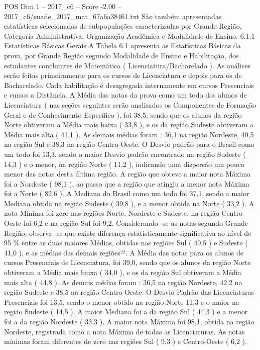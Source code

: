 \begin{textsample}{POS Dim 1 – 2017\_c6 – Score -2.00 – 2017\_c6/enade\_2017\_mat\_67a6a38461.txt}
São também apresentadas estatísticas selecionadas de subpopulações caracterizadas por Grande Região, Categoria Administrativa, Organização Acadêmica e Modalidade de Ensino. 6.1.1 Estatísticas Básicas Gerais A Tabela 6.1 apresenta as Estatísticas Básicas da prova, por Grande Região segundo Modalidade de Ensino e Habilitação, dos estudantes concluintes de Matemática ( Licenciatura/Bacharelado ).
As análises serão feitas primeiramente para os cursos de Licenciatura e depois para os de Bacharelado.
Cada habilitação é desagregada internamente em cursos Presenciais e cursos a Distância.
A Média das notas da prova como um todo dos alunos de Licenciatura ( nas seções seguintes serão analisados os Componentes de Formação Geral e de Conhecimento Específico ), foi 38,5, sendo que os alunos da região Norte obtiveram a Média mais baixa ( 33,8 ), e os da região Sudeste obtiveram a Média mais alta ( 41,1 ).
As demais médias foram : 36,1 na região Nordeste, 40,5 na região Sul e 38,3 na região Centro-Oeste.
O Desvio padrão para o Brasil como um todo foi 13,3, sendo o maior Desvio padrão encontrado na região Sudeste ( 14,3 ) e o menor, na região Norte ( 11,2 ), indicando uma dispersão um pouco menor das notas desta última região.
A região que obteve a maior nota Máxima foi a Nordeste ( 98,1 ), ao passo que a região que atingiu a menor nota Máxima foi a Norte ( 82,6 ).
A Mediana do Brasil como um todo foi 37,1, sendo a maior Mediana obtida na região Sudeste ( 39,8 ), e a menor obtida na Norte ( 33,2 ).
A nota Mínima foi zero nas regiões Norte, Nordeste e Sudeste, na região Centro-Oeste foi 6,2 e na região Sul foi 9,2.
Considerando -se as notas segundo Grande Região, observa -se que existe diferença estatisticamente significativa ao nível de 95 \% entre as duas maiores Médias, obtidas nas regiões Sul ( 40,5 ) e Sudeste ( 41,0 ), e as médias das demais regiões²².
A Média das notas para os alunos de cursos Presenciais de Licenciatura, foi 39,0, sendo que os alunos da região Norte obtiveram a Média mais baixa ( 34,0 ), e os da região Sul obtiveram a Média mais alta ( 44,8 ).
As demais médias foram : 36,5 na região Nordeste, 42,2 na região Sudeste e 38,5 na região Centro-Oeste.
O Desvio Padrão das Licenciaturas Presenciais foi 13,5, sendo o menor obtido na região Norte 11,3 e o maior na região Sudeste ( 14,5 ).
A maior Mediana foi a da região Sul ( 44,3 ) e a menor foi a da região Nordeste ( 33,3 ).
A maior nota Máxima foi 98,1, obtida na região Nordeste, registrada como a nota Máxima de todas as Licenciaturas.
As notas mínimas foram diferentes de zero nas regiões Sul ( 9,3 ) e Centro-Oeste ( 6,2 ).

\end{textsample}
